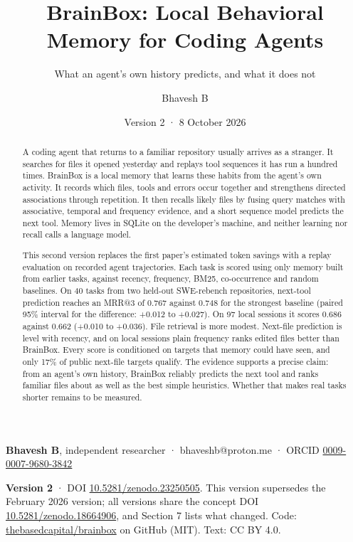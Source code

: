 \documentclass[
  american,
  11pt,
]{article}
\title{BrainBox: Local Behavioral Memory for Coding Agents}
\subtitle{What an agent's own history predicts, and what it does not}
\author{Bhavesh B}
\date{Version 2 · 8 October 2026}
\begin{document}
\maketitle
\begin{abstract}
A coding agent that returns to a familiar repository usually arrives as a stranger. It searches for files it
opened yesterday and replays tool sequences it has run a hundred times. BrainBox is a local memory that learns
these habits from the agent's own activity. It records which files, tools and errors occur together and
strengthens directed associations through repetition. It then recalls likely files by fusing query matches
with associative, temporal and frequency evidence, and a short sequence model predicts the next tool. Memory
lives in SQLite on the developer's machine, and neither learning nor recall calls a language model.

This second version replaces the first paper's estimated token savings with a replay evaluation on recorded
agent trajectories. Each task is scored using only memory built from earlier tasks, against recency,
frequency, BM25, co-occurrence and random baselines. On 40 tasks from two held-out SWE-rebench repositories,
next-tool prediction reaches an MRR@3 of 0.767 against 0.748 for the strongest baseline (paired 95\% interval
for the difference: +0.012 to +0.027). On 97 local sessions it scores 0.686 against 0.662 (+0.010 to +0.036).
File retrieval is more modest. Next-file prediction is level with recency, and on local sessions plain
frequency ranks edited files better than BrainBox. Every score is conditioned on targets that memory could
have seen, and only 17\% of public next-file targets qualify. The evidence supports a precise claim: from an
agent's own history, BrainBox reliably predicts the next tool and ranks familiar files about as well as the
best simple heuristics. Whether that makes real tasks shorter remains to be measured.
\end{abstract}

\textbf{Bhavesh B}, independent researcher · bhaveshb@proton.me · ORCID
\href{https://orcid.org/0009-0007-9680-3842}{0009-0007-9680-3842}

\textbf{Version 2} · DOI \href{https://doi.org/10.5281/zenodo.23250505}{10.5281/zenodo.23250505}. This version
supersedes the February 2026 version; all versions share the concept DOI
\href{https://doi.org/10.5281/zenodo.18664906}{10.5281/zenodo.18664906}, and Section 7 lists what changed.
Code: \href{https://github.com/thebasedcapital/brainbox}{thebasedcapital/brainbox} on GitHub (MIT). Text: CC
BY 4.0.
\end{document}
